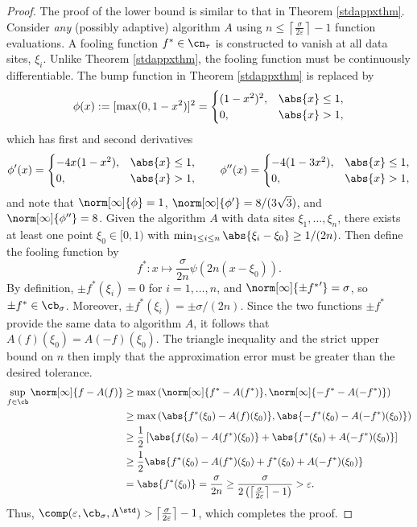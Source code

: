 \documentclass[12pt]{amsart}
\begin{document}
\begin{proof}
The proof of the lower bound is similar to that in Theorem \ref{stdappxthm}. Consider \emph{any} (possibly adaptive) algorithm $A$ using $n\le \left \lceil \frac{\sigma}{2\varepsilon} \right \rceil - 1$ function evaluations. 
A fooling function $f^* \in \cn_\tau$ is constructed to vanish at all data sites, $\xi_i$.  Unlike Theorem  \ref{stdappxthm}, the fooling function must be continuously differentiable.  The bump function in Theorem \ref{stdappxthm} is replaced by 
\begin{equation} \label{contbump}
\phi(x) : = [\max(0,1-x^2)]^2 = \begin{cases}(1-x^2)^2, & \abs{x} \le 1, \\
0, & \abs{x} > 1,
\end{cases}
\end{equation}
which has first and second derivatives
\begin{equation} \label{contbump}
\phi'(x) = \begin{cases} -4x(1-x^2), & \abs{x} \le 1, \\
0, & \abs{x} > 1,
\end{cases} \qquad 
\phi''(x) = \begin{cases} -4(1-3x^2), & \abs{x} \le 1, \\
0, & \abs{x} > 1,
\end{cases}
\end{equation}
and note that $\norm[\infty]{\phi} = 1$, $\norm[\infty]{\phi'}=8/(3 \sqrt{3})$, and $\norm[\infty]{\phi''}=8$.  Given the algorithm $A$ with data sites $\xi_1, \ldots, \xi_n$, there exists at least one point $\xi_0 \in [0,1)$ with $\min_{1 \le i \le n} \abs{\xi_i -\xi_0} \ge 1/(2n)$.  Then define the fooling function by 
\[
f^*: x \mapsto \frac{\sigma}{2n}\psi(2n(x-\xi_0)).
\]
By definition, $\pm f^*(\xi_i)=0$ for $i=1, \ldots, n$, and $\norm[\infty]{\pm{f^*}'} = \sigma$, so $\pm f^* \in \cb_\sigma$.   Moreover, $\pm f^*(\xi_i)= \pm \sigma/(2n)$.  Since the two functions $\pm f^*$ provide the same data to algorithm $A$, it follows that $A(f)(\xi_0)=A(-f)(\xi_0)$.  The triangle inequality and the strict upper bound on $n$ then imply that the approximation error must be greater than the desired tolerance.
\begin{align*}
\sup_{f \in \cb} \norm[\infty]{f - A(f)} 
&\ge \max\left(\norm[\infty]{f^* - A(f^*)},\norm[\infty]{-f^* - A(- f^*)}\right) \\ 
& \ge \max\left(\abs{f^*(\xi_0) - A(f)(\xi_0)},\abs{-f^*(\xi_0) - A(-f^*)(\xi_0)}\right) \\
& \ge \frac{1}{2} \left [ \abs{f(\xi_0) - A(f^*)(\xi_0)} + \abs{f^*(\xi_0)+ A(-f^*)(\xi_0)} \right ]\\
& \ge \frac{1}{2} \abs{f^*(\xi_0) - A(f^*)(\xi_0) + f^*(\xi_0) + A(-f^*)(\xi_0)}\\
& = \abs{f^*(\xi_0)} = \frac{\sigma}{2n} \ge \frac{\sigma}{2 \left(\left \lceil \frac{\sigma}{2\varepsilon} \right \rceil - 1\right)} > \varepsilon. 
\end{align*}
Thus, $\comp(\varepsilon,\cb_{\sigma},\Lambda^{\std}) > \left \lceil \frac{\sigma}{2\varepsilon} \right \rceil -1$, which completes the proof.
\end{proof}
\end{document}
